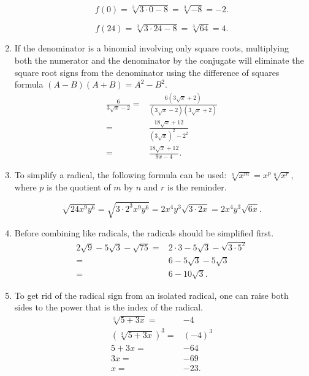 \documentclass[
  12pt]{article}
\begin{document}
\begin{enumerate}
  \[f(0)=\sqrt[3]{3\cdot 0-8}=\sqrt[3]{-8}=-2.\]

  \[f(24)=\sqrt[3]{3\cdot 24-8}=\sqrt[3]{64}=4.\]
\item
  If the denominator is a binomial involving only square roots,
  multiplying both the numerator and the denominator by the conjugate
  will eliminate the square root signs from the denominator using the
  difference of squares formula \((A-B)(A+B)=A^2-B^2\). \[
  \begin{aligned}
  \frac{6}{3\sqrt{x}-2}=&\frac{6(3\sqrt{x}+2)}{(3\sqrt{x}-2)(3\sqrt{x}+2)}\\
  =&\frac{18\sqrt{x}+12}{(3\sqrt{x})^2-2^2}\\
  =&\frac{18\sqrt{x}+12}{9x-4}.
  \end{aligned}
  \]
\item
  To simplify a radical, the following formula can be used:
  \(\sqrt[n]{x^m}=x^p\sqrt[n]{x^r}\), where \(p\) is the quotient of
  \(m\) by \(n\) and \(r\) is the reminder.

  \[\sqrt{24x^9y^6}=\sqrt{3\cdot 2^3x^9y^6}=2x^4y^3\sqrt{3\cdot 2 x}=2x^4y^3\sqrt{6x}.\]
\item
  Before combining like radicals, the radicals should be simplified
  first. \[
  \begin{aligned}
  2\sqrt{9}-5\sqrt3-\sqrt{75}=&2\cdot 3-5\sqrt3-\sqrt{3\cdot 5^2}\\
  =&6-5\sqrt3-5\sqrt3\\
  =&6-10\sqrt3.
  \end{aligned}
  \]
\item
  To get rid of the radical sign from an isolated radical, one can raise
  both sides to the power that is the index of the radical. \[
  \begin{aligned}
  \sqrt[3]{5+3x}=&-4\\
  (\sqrt[3]{5+3x})^3=&(-4)^3\\
  5+3x=&-64\\
  3x=&-69\\
  x=&-23.
  \end{aligned}
  \]


\end{enumerate}
\end{document}
